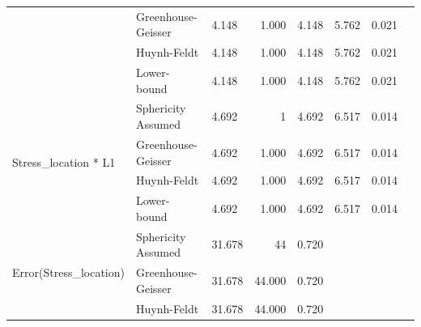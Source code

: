 \documentclass[a4paper]{article}
\begin{document}
\begin{table}[H]
\begin{center}
\begin{tabular}{p{}p{}|l|r|r|r|r|r|}
\cline{2-7}
                                                        & Greenhouse-Geisser & 4.148                             & 1.000                   & 4.148                            & 5.762                  & 0.021                      \\ 
\cline{2-7}
                                                        & Huynh-Feldt        & 4.148                             & 1.000                   & 4.148                            & 5.762                  & 0.021                      \\ 
\cline{2-7}
                                                        & Lower-bound        & 4.148                             & 1.000                   & 4.148                            & 5.762                  & 0.021                      \\ 
\hline
\multirow{4}{*}{Stress\_location * L1}                  & Sphericity Assumed & 4.692                             & 1                       & 4.692                            & 6.517                  & 0.014                      \\ 
\cline{2-7}
                                                        & Greenhouse-Geisser & 4.692                             & 1.000                   & 4.692                            & 6.517                  & 0.014                      \\ 
\cline{2-7}
                                                        & Huynh-Feldt        & 4.692                             & 1.000                   & 4.692                            & 6.517                  & 0.014                      \\ 
\cline{2-7}
                                                        & Lower-bound        & 4.692                             & 1.000                   & 4.692                            & 6.517                  & 0.014                      \\ 
\hline
\multirow{4}{*}{Error(Stress\_location)}                & Sphericity Assumed & 31.678                            & 44                      & 0.720                            & \multicolumn{1}{l|}{~} & \multicolumn{1}{l|}{~}     \\ 
\cline{2-7}
                                                        & Greenhouse-Geisser & 31.678                            & 44.000                  & 0.720                            & \multicolumn{1}{l|}{~} & \multicolumn{1}{l|}{~}     \\ 
\cline{2-7}
                                                        & Huynh-Feldt        & 31.678                            & 44.000                  & 0.720                            & \multicolumn{1}{l|}{~} & \multicolumn{1}{l|}{~}     \\ 

\end{tabular}
\end{center}
\end{table}
\end{document}
